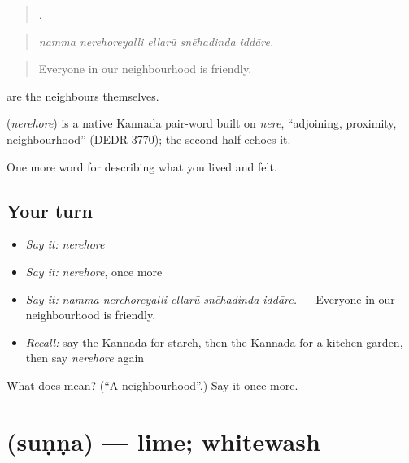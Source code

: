 \begin{quote}
    .
\end{quote}

\begin{quote}
\emph{namma nerehoreyalli ellarū snēhadinda iddāre.}
\end{quote}

\begin{quote}
Everyone in our neighbourhood is friendly.
\end{quote}

 are the neighbours themselves.

\begin{cousinweb}
\textbf{} (\emph{nerehore}) is a native Kannada pair-word built on \emph{nere}, \textquotedblleft{}adjoining, proximity, neighbourhood\textquotedblright{} (DEDR 3770); the second half echoes it.
\end{cousinweb}

\begin{grammarlens}[title={What you've built}]
One more word for describing what you lived and felt.
\end{grammarlens}

\subsection*{Your turn}
\begin{itemize}
\raggedright
  \item \emph{Say it:} \emph{nerehore}
  \item \emph{Say it:} \emph{nerehore}, once more
  \item \emph{Say it:} \emph{namma nerehoreyalli ellarū snēhadinda iddāre.} — Everyone in our neighbourhood is friendly.
  \item \emph{Recall:} say the Kannada for starch, then the Kannada for a kitchen garden, then say \emph{nerehore} again
\end{itemize}

\begin{tcolorbox}[breakable,colback=teal!4,colframe=teal!35!black,title={Before you move on}]
What does  mean? (\textquotedblleft{}A neighbourhood\textquotedblright{}.) Say it once more.
\end{tcolorbox}
\section[\texorpdfstring{\kn{ಸುಣ್ಣ} (suṇṇa)}{ಸುಣ್ಣ (suṇṇa)}]{ (suṇṇa) — lime; whitewash}

